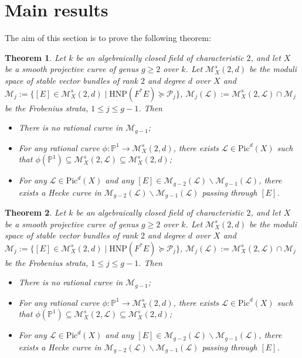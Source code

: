 \documentclass[10pt,a4paper]{amsart}
\newtheorem{theorem}{Theorem}
\begin{document}
\section{Main results}\label{sec4}
The aim of this section is to prove the following theorem: 
\begin{theorem}
Let $k$ be an algebraically closed field of characteristic $2$, and let $X$ be a smooth projective curve of genus $g\geqslant 2$ over $k$. Let $\mathcal{M}^s_X(2,d)$ be the moduli space of stable vector bundles of rank $2$ and degree $d$ over $X$ and $\mathcal{M}_j:=\{ [E]\in \mathcal{M}_X^s(2,d) \mid \mathrm{HNP}(F^*E) \succcurlyeq \mathscr{P}_j \}$, $\mathcal{M}_j(\mathcal{L}):=\mathcal{M}^s_X(2,\mathcal{L}) \cap \mathcal{M}_j$ be the Frobenius strata,  $1\leqslant j \leqslant g-1$. Then
\begin{itemize}
    \item [(1)] There is no rational curve in $\mathcal{M}_{g-1}$;
    \item[(2)] For any rational curve $\phi: \mathbb{P}^1 \to \mathcal{M}^s_X(2,d)$, there exists $\mathcal{L} \in \mathrm{Pic}^d(X)$ such that $\phi(\mathbb{P}^1) \subseteq \mathcal{M}^s_X(2,\mathcal{L}) \subseteq \mathcal{M}^s_X(2,d)$;
    \item[(3)] For any $\mathcal{L}\in \mathrm{Pic}^d(X)$ and any $[E] \in \mathcal{M}_{g-2}(\mathcal{L}) \backslash \mathcal{M}_{g-1}(\mathcal{L})$, there exists a Hecke curve in $\mathcal{M}_{g-2}(\mathcal{L})\backslash \mathcal{M}_{g-1}(\mathcal{L})$ passing through $[E]$.
\end{itemize}
\end{theorem}

\begin{theorem}
Let $k$ be an algebraically closed field of characteristic $2$, and let $X$ be a smooth projective curve of genus $g\geqslant 2$ over $k$. Let $\mathcal{M}^s_X(2,d)$ be the moduli space of stable vector bundles of rank $2$ and degree $d$ over $X$ and $\mathcal{M}_j:=\{ [E]\in \mathcal{M}_X^s(2,d) \mid \mathrm{HNP}(F^*E) \succcurlyeq \mathscr{P}_j \}$, $\mathcal{M}_j(\mathcal{L}):=\mathcal{M}^s_X(2,\mathcal{L}) \cap \mathcal{M}_j$ be the Frobenius strata,  $1\leqslant j \leqslant g-1$. Then
\begin{itemize}
    \item [(1)] There is no rational curve in $\mathcal{M}_{g-1}$;
    \item[(2)] For any rational curve $\phi: \mathbb{P}^1 \to \mathcal{M}^s_X(2,d)$, there exists $\mathcal{L} \in \mathrm{Pic}^d(X)$ such that $\phi(\mathbb{P}^1) \subseteq \mathcal{M}^s_X(2,\mathcal{L}) \subseteq \mathcal{M}^s_X(2,d)$;
    \item[(3)] For any $\mathcal{L}\in \mathrm{Pic}^d(X)$ and any $[E] \in \mathcal{M}_{g-2}(\mathcal{L}) \backslash \mathcal{M}_{g-1}(\mathcal{L})$, there exists a Hecke curve in $\mathcal{M}_{g-2}(\mathcal{L})\backslash \mathcal{M}_{g-1}(\mathcal{L})$ passing through $[E]$.
\end{itemize}
\end{theorem}
\end{document}
